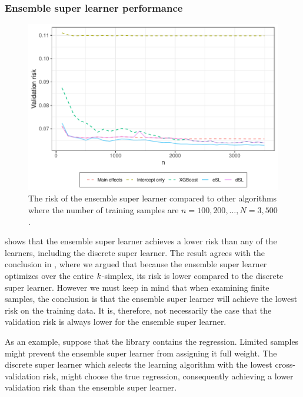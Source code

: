 \documentclass[./main.tex]{subfiles}
\begin{document}
\subsubsection{Ensemble super learner performance}
\begin{figure}[H]
    \centering
    \includegraphics[width=\textwidth]{figures/losses_esl_s22.pdf}
    \caption{The risk of the ensemble super learner compared to other algorithms where the number of training samples are $n = 100, 200, \dots , N = 3,500 $.}
    \label{fig:losses_esl_s22}
\end{figure}
 shows that the ensemble super learner achieves a lower risk than any of the learners, including the discrete super learner. The result agrees with the conclusion in , where we argued that because the ensemble super learner optimizes over the entire $ k $-simplex, its risk is lower compared to the discrete super learner. However we must keep in mind that when examining finite samples, the conclusion is that the ensemble super learner will achieve the lowest risk on the training data. It is, therefore, not necessarily the case that the validation risk is always lower for the ensemble super learner. 

As an example, suppose that the library contains the regression. Limited samples might prevent the ensemble super learner from assigning it full weight. The discrete super learner which selects the learning algorithm with the lowest cross-validation risk, might choose the true regression, consequently achieving a lower validation risk than the ensemble super learner.
\end{document}
